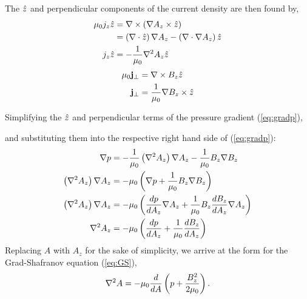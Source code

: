 \noindent The $\hat{z}$ and perpendicular components of the current density are then found by,
\begin{equation}
    \begin{split}
        \mu_0 j_z\hat{z} &= \nabla \times\left( \nabla A_z\times\hat{z} \right) \\
        &= \left( \nabla \cdot\hat{z} \right)\nabla A_z - \left( \nabla \cdot\nabla A_z \right)\hat{z} \\
       j_z\hat{z} &= -\frac{1}{\mu_0}\nabla^2 A_z\hat{z} \\
    \end{split}
    \label{eq:jz}
\end{equation}
\begin{equation}
    \begin{split}
        \mu_0\jvec_\perp &= \delcross B_z\zhat \\
        \jvec_\perp &= \frac{1}{\mu_0}\grad B_z\cross\zhat \\
    \end{split}
    \label{{eq:jperp}}
\end{equation}

\noindent Simplifying the $\hat{z}$ and perpendicular terms of the pressure gradient (\ref{eq:gradp}),

\noindent and substituting them into the respective right hand side of (\ref{eq:gradp}):
\[
    \begin{split}
        \nabla p &= -\frac{1}{\mu_0}\left( \nabla^2 A_z \right)\nabla A_z - \frac{1}{\mu_0}B_z\nabla B_z \\
        \left( \nabla^2 A_z \right)\nabla A_z &= -\mu_0\left( \nabla p+ \frac{1}{\mu_0}B_z\nabla B_z \right) \\
        \left( \nabla^2 A_z \right)\nabla A_z &= -\mu_0 \left( \frac{d p}{d A_z}\nabla A_z + \frac{1}{\mu_0}B_z\frac{d B_z}{d A_z}\nabla A_z \right) \\
        \nabla^2 A_z &= -\mu_0\left( \frac{d p}{d A_z} + \frac{1}{\mu_0}\frac{d B_z}{d A_z} \right) \\
    \end{split}
\]
Replacing $A$ with $A_z$ for the sake of simplicity, we arrive at the form for the Grad-Shafranov equation (\ref{eq:GS}),
\begin{equation}
    \nabla^2 A = -\mu_0\frac{d }{d A}\left( p + \frac{B_z^2}{2\mu_0} \right).
    \label{eq:gradp2}
\end{equation}


